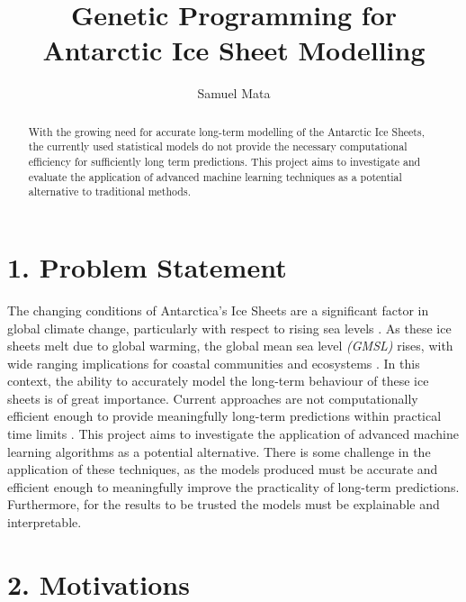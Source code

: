 \documentclass[11pt, a4paper, twoside, openright]{report}
\title{Genetic Programming for Antarctic Ice Sheet Modelling}
\author{Samuel Mata}
\date{}
\begin{document}
\frontmatter

\begin{abstract}
  With the growing need for accurate long-term modelling of
  the Antarctic Ice Sheets, the currently used statistical
  models do not provide the necessary computational 
  efficiency for sufficiently long term predictions. This
  project aims to investigate and evaluate the application
  of advanced machine learning techniques as a potential
  alternative to traditional methods.
\end{abstract}


\maketitle
\mainmatter


\section*{1. Problem Statement}

The changing conditions of Antarctica's Ice Sheets are a 
significant factor in global climate change, particularly
with respect to rising sea levels \cite{edwards2021projected}.
As these ice sheets melt due to global warming, the global
mean sea level \textit{(GMSL)} rises, with wide ranging 
implications for coastal communities and ecosystems \cite{hinkel2014coastal}.
In this context, the
ability to accurately model the long-term behaviour of
these ice sheets is of great importance. Current approaches
are not computationally efficient enough to provide
meaningfully long-term predictions within practical time
limits \cite{huybrechts1988evolution}. This project aims to investigate the application of
advanced machine learning algorithms as a potential
alternative. There is some
challenge in the application of these techniques, as the
models produced must be accurate and efficient enough to
meaningfully improve the practicality of long-term
predictions. Furthermore, for the results to be trusted
the models must be explainable and interpretable.


\section*{2. Motivations}
\end{document}

